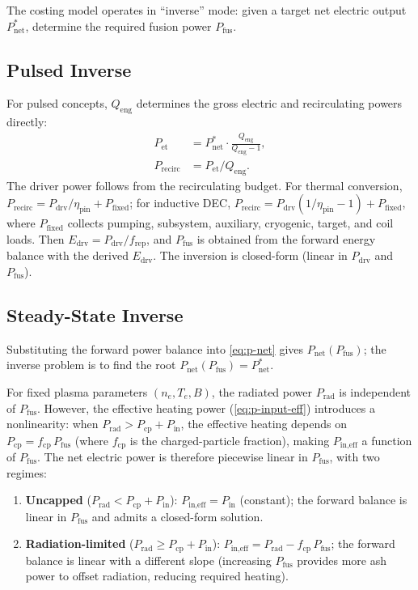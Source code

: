\documentclass{article}
\begin{document}
The costing model operates in ``inverse'' mode: given a target net
electric output $P_{\text{net}}^*$, determine the required fusion power
$P_{\text{fus}}$.

\subsection{Pulsed Inverse}
For pulsed concepts, $Q_{\text{eng}}$ determines the gross electric and
recirculating powers directly:
\begin{align}
P_{\text{et}} &= P_{\text{net}}^* \cdot \frac{Q_{\text{eng}}}{Q_{\text{eng}} - 1}, \\
P_{\text{recirc}} &= P_{\text{et}} / Q_{\text{eng}}.
\end{align}
The driver power follows from the recirculating budget. For thermal
conversion, $P_{\text{recirc}} = P_{\text{drv}}/\eta_{\text{pin}}
+ P_{\text{fixed}}$; for inductive DEC,
$P_{\text{recirc}} = P_{\text{drv}}(1/\eta_{\text{pin}} - 1)
+ P_{\text{fixed}}$, where $P_{\text{fixed}}$ collects
pumping, subsystem, auxiliary, cryogenic, target, and coil loads.
Then $E_{\text{drv}} = P_{\text{drv}} / f_{\text{rep}}$, and
$P_{\text{fus}}$ is obtained from the forward energy balance
with the derived $E_{\text{drv}}$. The inversion is closed-form
(linear in $P_{\text{drv}}$ and $P_{\text{fus}}$).

\subsection{Steady-State Inverse}

Substituting the forward power balance into
\cref{eq:p-net} gives $P_{\text{net}}(P_{\text{fus}})$; the inverse
problem is to find the root
$P_{\text{net}}(P_{\text{fus}}) = P_{\text{net}}^*$.

For fixed plasma parameters $(n_e, T_e, B)$, the radiated power
$P_{\text{rad}}$ is independent of $P_{\text{fus}}$. However, the
effective heating power (\cref{eq:p-input-eff}) introduces a
nonlinearity: when $P_{\text{rad}} > P_{\text{cp}} + P_{\text{in}}$,
the effective heating depends on $P_{\text{cp}} = f_{\text{cp}} \,
P_{\text{fus}}$ (where $f_{\text{cp}}$ is the charged-particle
fraction), making $P_{\text{in,eff}}$ a function of $P_{\text{fus}}$.
The net electric power is therefore piecewise linear in
$P_{\text{fus}}$, with two regimes:

\begin{enumerate}
\item \textbf{Uncapped} ($P_{\text{rad}} < P_{\text{cp}} + P_{\text{in}}$):
  $P_{\text{in,eff}} = P_{\text{in}}$ (constant); the forward balance
  is linear in $P_{\text{fus}}$ and admits a closed-form solution.
\item \textbf{Radiation-limited} ($P_{\text{rad}} \geq P_{\text{cp}} + P_{\text{in}}$):
  $P_{\text{in,eff}} = P_{\text{rad}} - f_{\text{cp}}\,P_{\text{fus}}$;
  the forward balance is linear with a different slope (increasing
  $P_{\text{fus}}$ provides more ash power to offset radiation, reducing
  required heating).
\end{enumerate}
\end{document}

